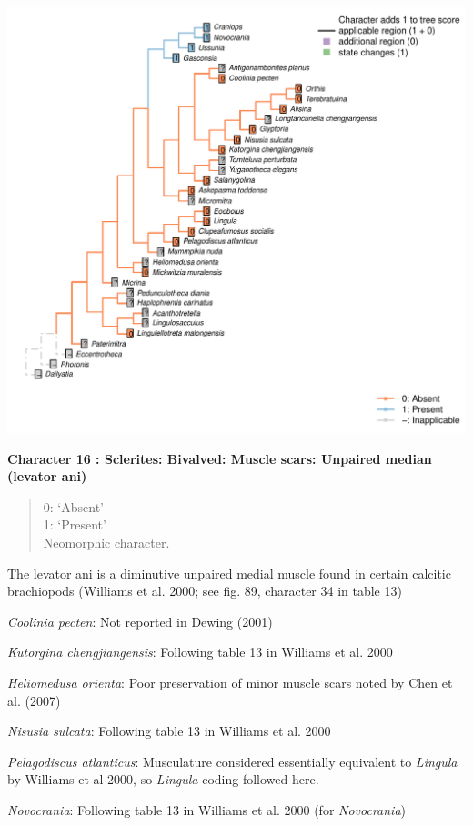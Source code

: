 \documentclass[]{book}
\theoremstyle{definition}
\theoremstyle{definition}
\theoremstyle{definition}
\theoremstyle{remark}
\begin{document}
\includegraphics{Brachiopod_phylogeny_files/figure-latex/unnamed-chunk-5-16.pdf}

\textbf{Character 16 : Sclerites: Bivalved: Muscle scars: Unpaired
median (levator ani) }

\begin{quote}
0: `Absent'\\
1: `Present'\\
Neomorphic character.
\end{quote}

The levator ani is a diminutive unpaired medial muscle found in certain
calcitic brachiopods (Williams et al. 2000; see fig. 89, character 34 in
table 13)

\emph{Coolinia pecten}: Not reported in Dewing (2001)

\emph{Kutorgina chengjiangensis}: Following table 13 in Williams et al.
2000

\emph{Heliomedusa orienta}: Poor preservation of minor muscle scars
noted by Chen et al. (2007)

\emph{Nisusia sulcata}: Following table 13 in Williams et al. 2000

\emph{Pelagodiscus atlanticus}: Musculature considered essentially
equivalent to \emph{Lingula} by Williams et al 2000, so \emph{Lingula}
coding followed here.

\emph{Novocrania}: Following table 13 in Williams et al. 2000 (for
\emph{Novocrania})
\end{document}
